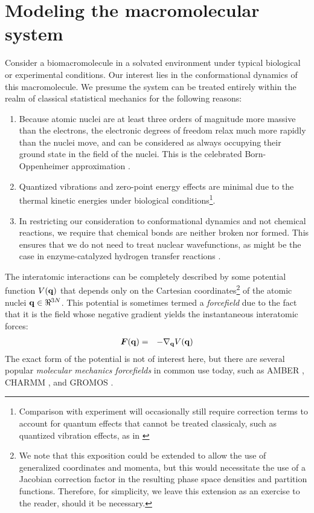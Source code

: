 \section{Modeling the macromolecular system}

Consider a biomacromolecule in a solvated environment under typical biological or experimental conditions.
Our interest lies in the conformational dynamics of this macromolecule.
We presume the system can be treated entirely within the realm of classical statistical mechanics for the following reasons:
\begin{enumerate}
  \item Because atomic nuclei are at least three orders of magnitude more massive than the electrons, the electronic degrees of freedom relax much more rapidly than the nuclei move, and can be considered as always occupying their ground state in the field of the nuclei.  
  This is the celebrated Born-Oppenheimer approximation \cite{born:1927a}.
  \item Quantized vibrations and zero-point energy effects are minimal due to the thermal kinetic energies under biological conditions\footnote{Comparison with experiment will occasionally still require correction terms to account for quantum effects that cannot be treated classicaly, such as quantized vibration effects, as in \cite{horn:jcp:2004}}.
  \item In restricting our consideration to conformational dynamics and not chemical reactions, we require that chemical bonds are neither broken nor formed.
  This ensures that we do not need to treat nuclear wavefunctions, as might be the case in enzyme-catalyzed hydrogen transfer reactions \cite{hammes-schiffer:acc-chem-res:2006}.
\end{enumerate}
The interatomic interactions can be completely described by some potential function $V({\bf q})$ that depends only on the Cartesian coordinates\footnote{We note that this exposition could be extended to allow the use of generalized coordinates and momenta, but this would necessitate the use of a Jacobian correction factor in the resulting phase space densities and partition functions.  Therefore, for simplicity, we leave this extension as an exercise to the reader, should it be necessary.} of the atomic nuclei ${\bf q} \in \Re^{3N}$.
This potential is sometimes termed a \emph{forcefield} due to the fact that it is the field whose negative gradient yields the instantaneous interatomic forces:  \label{notation:force} 
\begin{eqnarray}
{\mbox{\boldmath{$F$}}}({\bf q}) &=& - \nabla_{{\bf q}} V({\bf q}) \label{equation:force-definition}
\end{eqnarray}
The exact form of the potential is not of interest here, but there are several popular \emph{molecular mechanics forcefields} in common use today, such as AMBER \cite{AMBER-parm94,AMBER-parm96,AMBER-gaff,duan:2003a}, CHARMM \cite{mackerell:jpcb:1998}, and GROMOS \cite{oostenbrink:j-comput-chem:2004}. 

